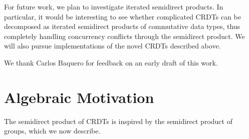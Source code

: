 \documentclass[acmsmall,nonacm]{acmart}
\theoremstyle{plain}
\theoremstyle{definition}
\begin{document}
For future work, we plan to investigate iterated semidirect products.  In particular, it would be interesting to see whether complicated CRDTs can be decomposed as iterated semidirect products of commutative data types, thus completely handling concurrency conflicts through the semidirect product.  We will also pursue implementations of the novel CRDTs described above.


\begin{acks}
We thank Carlos Baquero for feedback on an early draft of this work.
\end{acks}






\appendix

\section{Algebraic Motivation}
\label{sec:algebra}
The semidirect product of CRDTs is inspired by the semidirect product of groups, which we now describe.
\end{document}
